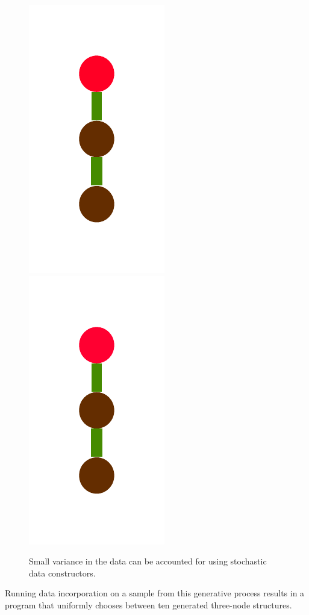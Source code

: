 \documentclass[a4paper,10pt]{article}
\begin{document}
\begin{figure}[t]
\includegraphics[scale=.26]{../figures/vector/4-2-4-constructor-induction-pre-8.pdf}
\includegraphics[scale=.26]{../figures/vector/4-2-4-constructor-induction-pre-9.pdf}
\caption{Small variance in the data can be accounted for using stochastic data constructors.}
\label{fig:noiseCons2}
\end{figure}

Running data incorporation on a sample from this generative process results in a program that uniformly chooses between ten generated three-node structures.
\end{document}
